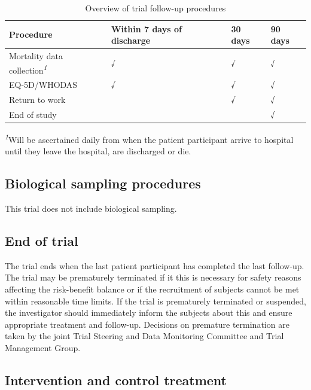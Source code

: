 \documentclass[
]{scrartcl}
\begin{document}
\hypertarget{tbl-procedures-followup}{}
\setlength{\LTpost}{0mm}
\begin{longtable}{llll}
\caption{\label{tbl-procedures-followup}Overview of trial follow-up procedures }\tabularnewline

\toprule
Procedure & Within 7 days of discharge & 30 days & 90 days \\ 
\midrule\addlinespace[2.5pt]
Mortality data collection\textsuperscript{\textit{1}} & √ & √ & √ \\ 
EQ-5D/WHODAS & √ & √ & √ \\ 
Return to work &  & √ & √ \\ 
End of study &  &  & √ \\ 
\bottomrule
\end{longtable}
\begin{minipage}{\linewidth}
\textsuperscript{\textit{1}}Will be ascertained daily from when the patient participant arrive to hospital until they leave the hospital, are discharged or die.\\
\end{minipage}

\hypertarget{biological-sampling-procedures}{%
\subsection{Biological sampling
procedures}\label{biological-sampling-procedures}}

This trial does not include biological sampling.

\hypertarget{end-of-trial}{%
\subsection{End of trial}\label{end-of-trial}}

The trial ends when the last patient participant has completed the last
follow-up. The trial may be prematurely terminated if it this is
necessary for safety reasons affecting the risk-benefit balance or if
the recruitment of subjects cannot be met within reasonable time limits.
If the trial is prematurely terminated or suspended, the investigator
should immediately inform the subjects about this and ensure appropriate
treatment and follow-up. Decisions on premature termination are taken by
the joint Trial Steering and Data Monitoring Committee and Trial
Management Group.

\hypertarget{intervention-and-control-treatment}{%
\subsection{Intervention and control
treatment}\label{intervention-and-control-treatment}}
\end{document}

